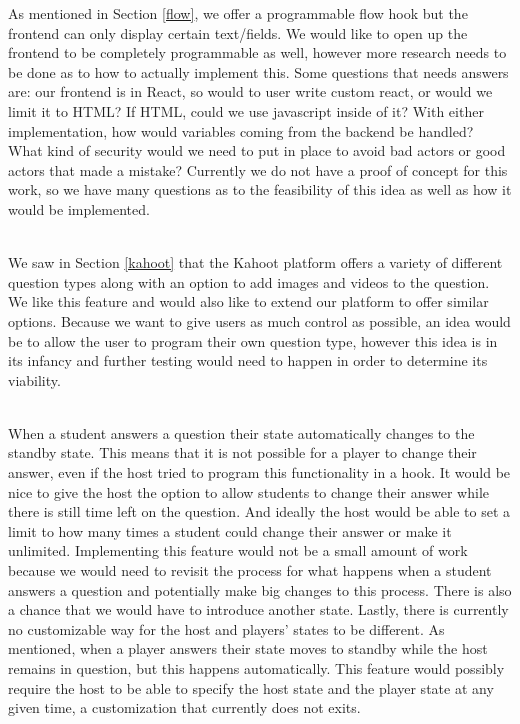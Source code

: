 \documentclass{article}
\begin{document}
    As mentioned in Section \ref{flow}, we offer a programmable flow hook but the frontend can only display certain text/fields. We would like to open up the frontend to be completely programmable as well, however more research needs to be done as to how to actually implement this. Some questions that needs answers are: our frontend is in React, so would to user write custom react, or would we limit it to HTML? If HTML, could we use javascript inside of it? With either implementation, how would variables coming from the backend be handled? What kind of security would we need to put in place to avoid bad actors or good actors that made a mistake? Currently we do not have a proof of concept for this work, so we have many questions as to the feasibility of this idea as well as how it would be implemented.
    \\\\
    \smallskip
    
    We saw in Section \ref{kahoot} that the Kahoot platform offers a variety of different question types along with an option to add images and videos to the question. We like this feature and would also like to extend our platform to offer similar options. Because we want to give users as much control as possible, an idea would be to allow the user to program their own question type, however this idea is in its infancy and further testing would need to happen in order to determine its viability.
    \\\\
    \smallskip
    
    When a student answers a question their state automatically changes to the standby state. This means that it is not possible for a player to change their answer, even if the host tried to program this functionality in a hook. It would be nice to give the host the option to allow students to change their answer while there is still time left on the question. And ideally the host would be able to set a limit to how many times a student could change their answer or make it unlimited. Implementing this feature would not be a small amount of work because we would need to revisit the process for what happens when a student answers a question and potentially make big changes to this process. There is also a chance that we would have to introduce another state. Lastly, there is currently no customizable way for the host and players' states to be different. As mentioned, when a player answers their state moves to standby while the host remains in question, but this happens automatically. This feature would possibly require the host to be able to specify the host state and the player state at any given time, a customization that currently does not exits.
    \\\\
    \smallskip
    
\end{document}
